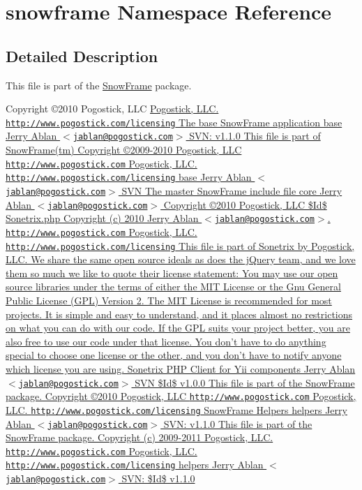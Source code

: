 \hypertarget{namespacesnowframe}{
\section{snowframe Namespace Reference}
\label{namespacesnowframe}
}


\subsection{Detailed Description}
This file is part of the \hyperlink{classSnowFrame}{SnowFrame} package.

Copyright \copyright 2010 Pogostick, LLC \hyperlink{}{Pogostick, LLC.  \href{http://www.pogostick.com/licensing}{\tt http://www.pogostick.com/licensing} The base SnowFrame application   base   Jerry Ablan $<$\href{mailto:jablan@pogostick.com}{\tt jablan@pogostick.com}$>$  SVN:   v1.1.0    This file is part of SnowFrame(tm)   Copyright \copyright 2009-\/2010 Pogostick, LLC  \href{http://www.pogostick.com}{\tt http://www.pogostick.com} Pogostick, LLC.  \href{http://www.pogostick.com/licensing}{\tt http://www.pogostick.com/licensing}   base   Jerry Ablan $<$\href{mailto:jablan@pogostick.com}{\tt jablan@pogostick.com}$>$  SVN    The master SnowFrame include file   core  Jerry Ablan $<$\href{mailto:jablan@pogostick.com}{\tt jablan@pogostick.com}$>$  Copyright \copyright 2010 Pogostick, LLC  \$Id\$  Sonetrix.php  Copyright (c) 2010 Jerry Ablan $<$\href{mailto:jablan@pogostick.com}{\tt jablan@pogostick.com}$>$.  \href{http://www.pogostick.com}{\tt http://www.pogostick.com} Pogostick, LLC.  \href{http://www.pogostick.com/licensing}{\tt http://www.pogostick.com/licensing}  This file is part of Sonetrix by Pogostick, LLC.  We share the same open source ideals as does the jQuery team, and we love them so much we like to quote their license statement:  You may use our open source libraries under the terms of either the MIT License or the Gnu General Public License (GPL) Version 2.  The MIT License is recommended for most projects. It is simple and easy to understand, and it places almost no restrictions on what you can do with our code.  If the GPL suits your project better, you are also free to use our code under that license.  You don’t have to do anything special to choose one license or the other, and you don’t have to notify anyone which license you are using. Sonetrix PHP Client for Yii   components   Jerry Ablan $<$\href{mailto:jablan@pogostick.com}{\tt jablan@pogostick.com}$>$  SVN \$Id\$  v1.0.0    This file is part of the SnowFrame package.   Copyright \copyright 2010 Pogostick, LLC  \href{http://www.pogostick.com}{\tt http://www.pogostick.com} Pogostick, LLC.  \href{http://www.pogostick.com/licensing}{\tt http://www.pogostick.com/licensing} SnowFrame Helpers   helpers   Jerry Ablan $<$\href{mailto:jablan@pogostick.com}{\tt jablan@pogostick.com}$>$  SVN:   v1.1.0    This file is part of the SnowFrame package.   Copyright (c) 2009-\/2011 Pogostick, LLC.  \href{http://www.pogostick.com}{\tt http://www.pogostick.com} Pogostick, LLC.  \href{http://www.pogostick.com/licensing}{\tt http://www.pogostick.com/licensing}   helpers   Jerry Ablan $<$\href{mailto:jablan@pogostick.com}{\tt jablan@pogostick.com}$>$  SVN: \$Id\$  v1.1.0   }